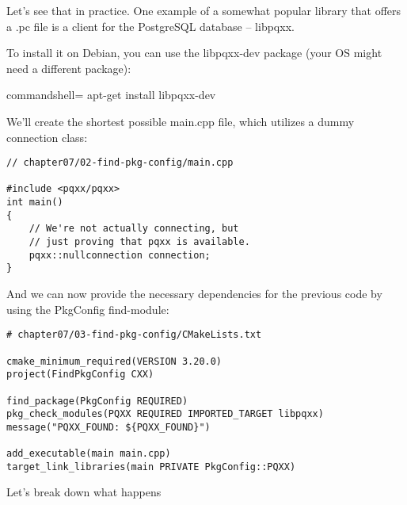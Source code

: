 Let's see that in practice. One example of a somewhat popular library that offers a .pc file is a client for the PostgreSQL database – libpqxx.

To install it on Debian, you can use the libpqxx-dev package (your OS might need a different package):

\begin{tcblisting}{commandshell={}}
apt-get install libpqxx-dev
\end{tcblisting}

We'll create the shortest possible main.cpp file, which utilizes a dummy connection class:

\begin{lstlisting}[style=styleCXX]
// chapter07/02-find-pkg-config/main.cpp

#include <pqxx/pqxx>
int main()
{
	// We're not actually connecting, but
	// just proving that pqxx is available.
	pqxx::nullconnection connection;
}
\end{lstlisting} 

And we can now provide the necessary dependencies for the previous code by using the PkgConfig find-module:

\begin{lstlisting}[style=styleCMake]
# chapter07/03-find-pkg-config/CMakeLists.txt

cmake_minimum_required(VERSION 3.20.0)
project(FindPkgConfig CXX)

find_package(PkgConfig REQUIRED)
pkg_check_modules(PQXX REQUIRED IMPORTED_TARGET libpqxx)
message("PQXX_FOUND: ${PQXX_FOUND}")

add_executable(main main.cpp)
target_link_libraries(main PRIVATE PkgConfig::PQXX)
\end{lstlisting}

Let's break down what happens

